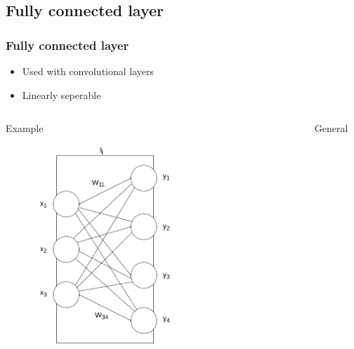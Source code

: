 \documentclass{beamer}
\begin{document}
\subsection{Fully connected layer}

\begin{frame}
    \frametitle{Fully connected layer}

    \begin{itemize}
        \item Used with convolutional layers
        \item Linearly seperable
    \end{itemize}

    \begin{columns}
        \begin{column}{0.5\textwidth}
            Example
            \begin{figure}
                \centering
                \includegraphics[width=0.6\textwidth]{../assets/linear-layer-example.png}
            \end{figure}
        \end{column}
        \pause
        \begin{column}{0.5\textwidth}
            General
            \begin{figure}
                \centering

\end{figure}
\end{column}
\end{columns}
\end{frame}
\end{document}
